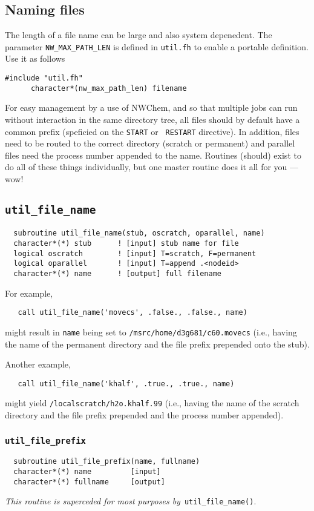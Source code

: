 \subsection{Naming files}

The length of a file name can be large and also system depenedent.
The parameter \verb+NW_MAX_PATH_LEN+ is defined in \verb+util.fh+ to
enable a portable definition.  Use it as follows
\begin{verbatim}
#include "util.fh"
      character*(nw_max_path_len) filename
\end{verbatim}

For easy management by a use of NWChem, and so that multiple jobs can
run without interaction in the same directory tree, all files should
by default have a common prefix (speficied on the {\tt START} or {\tt
  RESTART} directive).  In addition, files need to be routed to the
correct directory (scratch or permanent) and parallel files need the
process number appended to the name.  Routines (should) exist to do
all of these things individually, but one master routine does it all
for you --- wow!

\subsection{{\tt util\_file\_name}}
\begin{verbatim}
  subroutine util_file_name(stub, oscratch, oparallel, name)
  character*(*) stub      ! [input] stub name for file
  logical oscratch        ! [input] T=scratch, F=permanent
  logical oparallel       ! [input] T=append .<nodeid>
  character*(*) name      ! [output] full filename
\end{verbatim}

For example,
\begin{verbatim}
   call util_file_name('movecs', .false., .false., name)
\end{verbatim}
might result in \verb+name+ being set to
\verb+/msrc/home/d3g681/c60.movecs+ (i.e., having the name of the
permanent directory and the file prefix prepended onto the stub).

Another example,
\begin{verbatim}
   call util_file_name('khalf', .true., .true., name)
\end{verbatim}
might yield \verb+/localscratch/h2o.khalf.99+ (i.e., having the name
of the scratch directory and the file prefix prepended and the process
number appended).

\subsubsection{{\tt util\_file\_prefix}}
\begin{verbatim}
  subroutine util_file_prefix(name, fullname)
  character*(*) name         [input]
  character*(*) fullname     [output]
\end{verbatim}
{\em This routine is superceded for most purposes by}\ 
\verb+util_file_name()+.  


